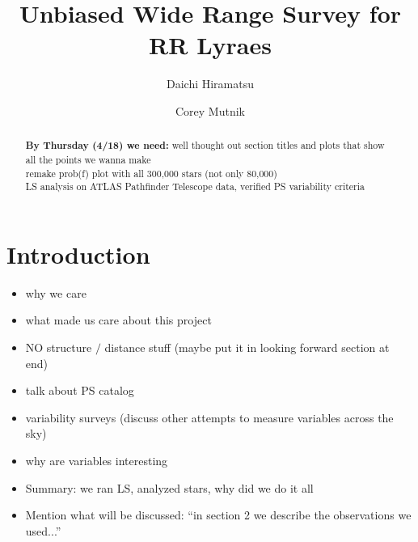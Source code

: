 \documentclass[aps,prb,twocolumn,superscriptaddress]{revtex4-1}
\begin{document}
\title{Unbiased Wide Range Survey for RR Lyraes}


%


\author{Daichi Hiramatsu}
\author{Corey Mutnik}



\begin{abstract}
\textbf{By Thursday (4/18) we need:} well thought out section titles and plots that show all the points we wanna make\\

remake prob(f) plot with all 300,000 stars (not only 80,000)\\

LS analysis on ATLAS Pathfinder Telescope data, verified PS variability criteria
\end{abstract}

\maketitle    




\section{Introduction}


\begin{itemize}
	\item{} why we care
	\item{} what made us care about this project
	\item{} NO structure $/$ distance stuff (maybe put it in looking forward section at end)
	\item{} talk about PS catalog
	\item{} variability surveys (discuss other attempts to measure variables across the sky)
	\item{} why are variables interesting
	\item{} Summary: we ran LS, analyzed stars, why did we do it all
	\item{} Mention what will be discussed: ``in section 2 we describe the observations we used...''
\end{itemize}
\end{document}

